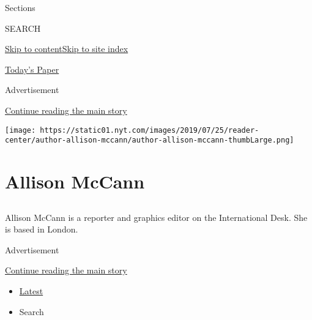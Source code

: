 Sections

SEARCH

\protect\hyperlink{site-content}{Skip to
content}\protect\hyperlink{site-index}{Skip to site index}

\href{https://myaccount.nytimes.com/auth/login?response_type=cookie\&client_id=vi}{}

\href{https://www.nytimes.com/section/todayspaper}{Today's Paper}

Advertisement

\protect\hyperlink{after-top}{Continue reading the main story}

\texttt{[image: https://static01.nyt.com/images/2019/07/25/reader-center/author-allison-mccann/author-allison-mccann-thumbLarge.png]}

\hypertarget{allison-mccann}{%
\section{Allison McCann}\label{allison-mccann}}

\subsection{}

Allison McCann is a reporter and graphics editor on the International
Desk. She is based in London.

Advertisement

\protect\hyperlink{after-mid1}{Continue reading the main story}

\begin{itemize}
\tightlist
\item
  \protect\hyperlink{stream-panel}{Latest}
\item
  Search
\end{itemize}

